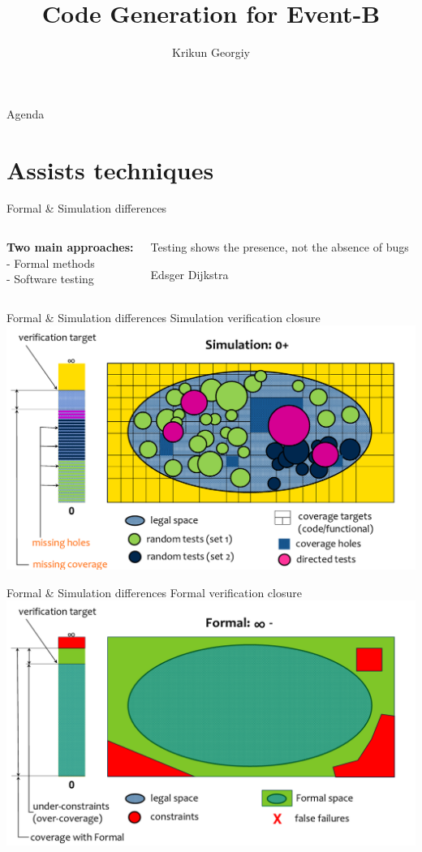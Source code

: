 \documentclass{beamer}
\title{Code Generation for Event-B}
\date{}
\author{Krikun Georgiy}
\institute{Innopolis University}
\begin{document}
  \maketitle

  \begin{frame}{Agenda}
    \tableofcontents
  \end{frame}

  \section{Assists techniques}
  \begin{frame}{Formal \& Simulation differences}
    \begin{columns}
        \textbf{Two main approaches:}\\
        - Formal methods\\
        - Software testing\\
      {\color{black!50}
        \epigraph{Testing shows the presence, not the absence of bugs}
        {Edsger Dijkstra}
      }
    \end{columns}
  \end{frame} 

  \begin{frame}{Formal \& Simulation differences}
    Simulation verification closure
    \includegraphics[width=\linewidth]{test_coverage}
  \end{frame} 

  \begin{frame}{Formal \& Simulation differences}
    Formal verification closure
    \includegraphics[width=\linewidth]{formal_coverage}
  \end{frame} 
\end{document}
